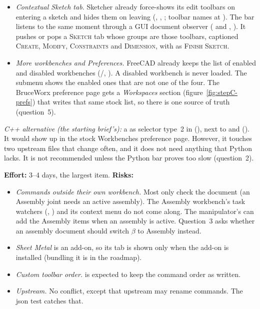 \begin{itemize}[nosep]
        it today. That module's two-row relayout becomes part of this one.
  \item \emph{Contextual Sketch tab.} Sketcher already force-shows its edit toolbars on entering a sketch and
        hides them on leaving (, ,
         ; toolbar names at ). The bar listens to the same moment
        through a GUI document observer ( and ,
        ). It pushes or pops a \textsc{Sketch} tab whose groups are
        those toolbars, captioned \textsc{Create}, \textsc{Modify}, \textsc{Constraints} and
        \textsc{Dimension}, with  as \textsc{Finish Sketch}.
  \item \emph{More workbenches and Preferences.} FreeCAD already keeps the list of enabled and disabled workbenches
        (/,
        ). A disabled workbench is never loaded.
        The submenu shows the enabled ones that are not one of the four. The BruceWorx preference page gets a
        \emph{Workspaces} section (figure~\ref{fig:stepC-prefs}) that writes that same stock list, so there
        is one source of truth (question~5).
\end{itemize}
\emph{C++ alternative (the starting brief's):} a  as selector type~2 in
 (), next to  and
 (). It would show up in the stock Workbenches
preference page. However, it touches two upstream files that change often, and it does not need anything that
Python lacks. It is not recommended unless the Python bar proves too slow (question~2).

\textbf{Effort:} 3--4 days, the largest item. \textbf{Risks:}
\begin{itemize}[nosep]
  \item \emph{Commands outside their own workbench.} Most only check the document (an Assembly joint needs an
        active assembly). The Assembly workbench's task watchers (,
        ) and its context menu do not come along. The manipulator's 
        can add the Assembly items when an assembly is active. Question~3 asks whether an assembly document
        should switch $\beta$ to Assembly instead.
  \item \emph{Sheet Metal} is an add-on, so its tab is shown only when the add-on is installed (bundling it is
        in the roadmap).
  \item \emph{Custom toolbar order.}  is expected to keep the command order as written.
        \verify
  \item \emph{Upstream.} No conflict, except that upstream may rename commands. The json test catches that.
\end{itemize}

